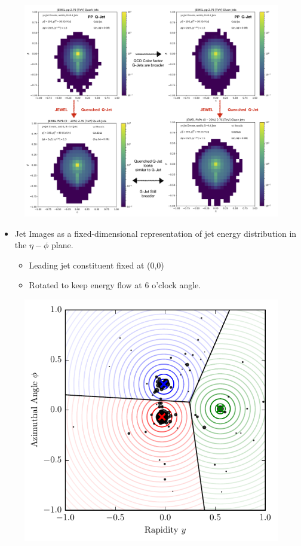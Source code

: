\documentclass[final]{beamer}
\begin{document}
\begin{frame}[t]
\begin{multicols}{3}
	\begin{figure}[h]
	  \centering
	  \includegraphics[width=0.9\columnwidth]{Figures/Jet_Image_Quenching_png}
	  \label{fig:qgjetimages}
	\end{figure}

	\begin{itemize}		
	\item {\color{blue} Jet Images} as a fixed-dimensional representation of jet energy distribution in the $\eta-\phi$ plane. 
		\begin{itemize}
			\item Leading jet constituent fixed at (0,0)
			\item Rotated to keep energy flow at 6 o'clock angle.  
		\end{itemize}
	\end{itemize}

	
	\begin{figure}[h]
	  \centering
	  \includegraphics[width=0.8\columnwidth]{Figures/Telescoping.pdf}
	  \label{fig:tjetQCD}
	\end{figure}
	

\end{multicols}
\end{frame}
\end{document}
